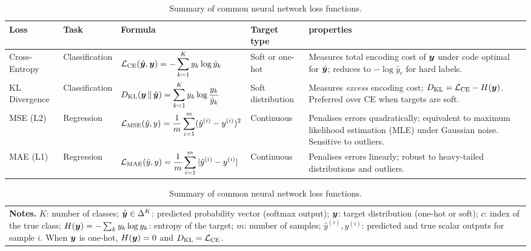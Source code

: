 \begin{table}[ht]
\centering
\caption{Summary of common neural network loss functions.}
\label{tab:loss_functions}
\renewcommand{\arraystretch}{1.45}
\begin{tabularx}{\textwidth}{@{} l l X l X @{}}
\toprule
\textbf{Loss} & \textbf{Task} & \textbf{Formula} & \textbf{Target type} & \textbf{properties} \\
\midrule

Cross-Entropy
  & Classification
  & $\mathcal{L}_{\text{CE}}(\hat{\bm{y}}, \bm{y}) = -\displaystyle\sum_{k=1}^{K} y_k \log \hat{y}_k$
  & Soft or one-hot
  & Measures total encoding cost of $\bm{y}$ under code optimal for $\hat{\bm{y}}$;
    reduces to $-\log\hat{y}_c$ for hard labels. \\

KL Divergence
  & Classification
  & $D_{\text{KL}}(\bm{y}\,\|\,\hat{\bm{y}}) = \displaystyle\sum_{k=1}^{K} y_k \log \dfrac{y_k}{\hat{y}_k}$
  & Soft distribution
  & Measures \emph{excess} encoding cost;
    $D_{\text{KL}} = \mathcal{L}_{\text{CE}} - H(\bm{y})$.
    Preferred over CE when targets are soft. \\

MSE (L2)
  & Regression
  & $\mathcal{L}_{\text{MSE}}(\hat{y}, y) = \dfrac{1}{m}\displaystyle\sum_{i=1}^{m}(\hat{y}^{(i)} - y^{(i)})^2$
  & Continuous
  & Penalises errors quadratically; equivalent to maximum likelihood estimation (MLE) under Gaussian noise.
    Sensitive to outliers. \\

MAE (L1)
  & Regression
  & $\mathcal{L}_{\text{MAE}}(\hat{y}, y) = \dfrac{1}{m}\displaystyle\sum_{i=1}^{m}|\hat{y}^{(i)} - y^{(i)}|$
  & Continuous
  & Penalises errors linearly; robust to heavy-tailed distributions and outliers. \\

\bottomrule
\end{tabularx}

\smallskip
\begin{tabularx}{\textwidth}{@{} X @{}}
\small
\textbf{Notes.}
$K$: number of classes;
$\hat{\bm{y}}\in\Delta^{K}$: predicted probability vector (softmax output);
$\bm{y}$: target distribution (one-hot or soft);
$c$: index of the true class;
$H(\bm{y}) = -\sum_k y_k\log y_k$: entropy of the target;
$m$: number of samples;
$\hat{y}^{(i)}, y^{(i)}$: predicted and true scalar outputs for sample $i$.
When $\bm{y}$ is one-hot, $H(\bm{y})=0$ and $D_{\text{KL}}=\mathcal{L}_{\text{CE}}$.
\\
\end{tabularx}
\end{table}
